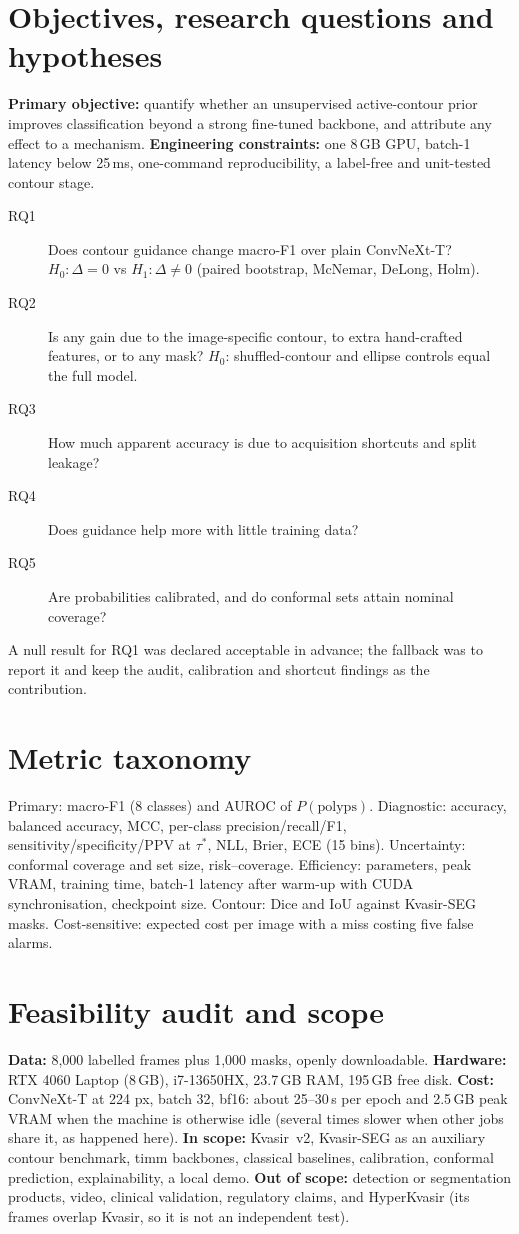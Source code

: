 \section{Objectives, research questions and hypotheses}
\textbf{Primary objective:} quantify whether an unsupervised active-contour prior improves classification beyond a strong fine-tuned backbone, and attribute any effect to a mechanism.
\textbf{Engineering constraints:} one 8\,GB GPU, batch-1 latency below 25\,ms, one-command reproducibility, a label-free and unit-tested contour stage.
\begin{description}
\item[RQ1] Does contour guidance change macro-F1 over plain ConvNeXt-T? $H_0:\Delta=0$ vs $H_1:\Delta\neq0$ (paired bootstrap, McNemar, DeLong, Holm).
\item[RQ2] Is any gain due to the image-specific contour, to extra hand-crafted features, or to any mask? $H_0$: shuffled-contour and ellipse controls equal the full model.
\item[RQ3] How much apparent accuracy is due to acquisition shortcuts and split leakage?
\item[RQ4] Does guidance help more with little training data?
\item[RQ5] Are probabilities calibrated, and do conformal sets attain nominal coverage?
\end{description}
A null result for RQ1 was declared acceptable in advance; the fallback was to report it and keep the audit, calibration and shortcut findings as the contribution.

\section{Metric taxonomy}
Primary: macro-F1 (8 classes) and AUROC of $P(\text{polyps})$. Diagnostic: accuracy, balanced accuracy, MCC, per-class precision/recall/F1, sensitivity/specificity/PPV at $\tau^\ast$, NLL, Brier, ECE (15 bins).
Uncertainty: conformal coverage and set size, risk--coverage. Efficiency: parameters, peak VRAM, training time, batch-1 latency after warm-up with CUDA synchronisation, checkpoint size.
Contour: Dice and IoU against Kvasir-SEG masks. Cost-sensitive: expected cost per image with a miss costing five false alarms.

\section{Feasibility audit and scope}
\textbf{Data:} 8{,}000 labelled frames plus 1{,}000 masks, openly downloadable. \textbf{Hardware:} RTX 4060 Laptop (8\,GB), i7-13650HX, 23.7\,GB RAM, 195\,GB free disk.
\textbf{Cost:} ConvNeXt-T at 224 px, batch 32, bf16: about 25--30\,s per epoch and 2.5\,GB peak VRAM when the machine is otherwise idle (several times slower when other jobs share it, as happened here).
\textbf{In scope:} Kvasir~v2, Kvasir-SEG as an auxiliary contour benchmark, timm backbones, classical baselines, calibration, conformal prediction, explainability, a local demo.
\textbf{Out of scope:} detection or segmentation products, video, clinical validation, regulatory claims, and HyperKvasir (its frames overlap Kvasir, so it is not an independent test).

